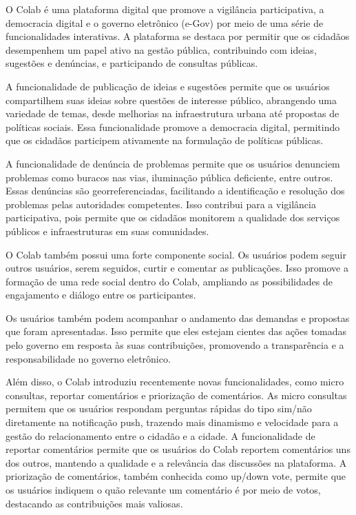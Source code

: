 O Colab é uma plataforma digital que promove a vigilância participativa, a democracia digital e o governo eletrônico (e-Gov) por meio de uma série de funcionalidades interativas. A plataforma se destaca por permitir que os cidadãos desempenhem um papel ativo na gestão pública, contribuindo com ideias, sugestões e denúncias, e participando de consultas públicas.

A funcionalidade de publicação de ideias e sugestões permite que os usuários compartilhem suas ideias sobre questões de interesse público, abrangendo uma variedade de temas, desde melhorias na infraestrutura urbana até propostas de políticas sociais. Essa funcionalidade promove a democracia digital, permitindo que os cidadãos participem ativamente na formulação de políticas públicas.

A funcionalidade de denúncia de problemas permite que os usuários denunciem problemas como buracos nas vias, iluminação pública deficiente, entre outros. Essas denúncias são georreferenciadas, facilitando a identificação e resolução dos problemas pelas autoridades competentes. Isso contribui para a vigilância participativa, pois permite que os cidadãos monitorem a qualidade dos serviços públicos e infraestruturas em suas comunidades.

O Colab também possui uma forte componente social. Os usuários podem seguir outros usuários, serem seguidos, curtir e comentar as publicações. Isso promove a formação de uma rede social dentro do Colab, ampliando as possibilidades de engajamento e diálogo entre os participantes.

Os usuários também podem acompanhar o andamento das demandas e propostas que foram apresentadas. Isso permite que eles estejam cientes das ações tomadas pelo governo em resposta às suas contribuições, promovendo a transparência e a responsabilidade no governo eletrônico.

Além disso, o Colab introduziu recentemente novas funcionalidades, como micro consultas, reportar comentários e priorização de comentários. As micro consultas permitem que os usuários respondam perguntas rápidas do tipo sim/não diretamente na notificação push, trazendo mais dinamismo e velocidade para a gestão do relacionamento entre o cidadão e a cidade. A funcionalidade de reportar comentários permite que os usuários do Colab reportem comentários uns dos outros, mantendo a qualidade e a relevância das discussões na plataforma. A priorização de comentários, também conhecida como up/down vote, permite que os usuários indiquem o quão relevante um comentário é por meio de votos, destacando as contribuições mais valiosas.

